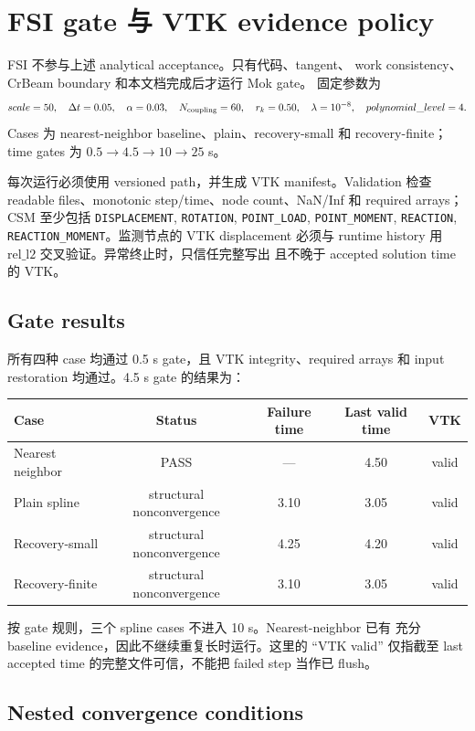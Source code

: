 \documentclass[11pt,a4paper]{article}
\newcommand{\relLtwo}{\mathrm{rel\_l2}}
\begin{document}
\section{FSI gate 与 VTK evidence policy}

FSI 不参与上述 analytical acceptance。只有代码、tangent、
work consistency、CrBeam boundary 和本文档完成后才运行 Mok gate。
固定参数为
\[
 scale=50,\quad\Delta t=0.05,\quad\alpha=0.03,\quad
 N_{\rm coupling}=60,\quad r_k=0.50,\quad
 \lambda=10^{-8},\quad polynomial\_level=4.
\]
Cases 为 nearest-neighbor baseline、plain、recovery-small 和
recovery-finite；time gates 为
$0.5\rightarrow4.5\rightarrow10\rightarrow25$ s。

每次运行必须使用 versioned path，并生成 VTK manifest。Validation
检查 readable files、monotonic step/time、node count、NaN/Inf 和
required arrays；CSM 至少包括
\texttt{DISPLACEMENT}, \texttt{ROTATION}, \texttt{POINT\_LOAD},
\texttt{POINT\_MOMENT}, \texttt{REACTION},
\texttt{REACTION\_MOMENT}。监测节点的 VTK displacement 必须与
runtime history 用 $\relLtwo$ 交叉验证。异常终止时，只信任完整写出
且不晚于 accepted solution time 的 VTK。

\subsection{Gate results}

所有四种 case 均通过 0.5 s gate，且 VTK integrity、required arrays
和 input restoration 均通过。4.5 s gate 的结果为：
\begin{center}
\begin{tabular}{lcccc}
\toprule
Case & Status & Failure time & Last valid time & VTK\\
\midrule
Nearest neighbor & PASS & --- & 4.50 & valid\\
Plain spline & structural nonconvergence & 3.10 & 3.05 & valid\\
Recovery-small & structural nonconvergence & 4.25 & 4.20 & valid\\
Recovery-finite & structural nonconvergence & 3.10 & 3.05 & valid\\
\bottomrule
\end{tabular}
\end{center}
按 gate 规则，三个 spline cases 不进入 10 s。Nearest-neighbor 已有
充分 baseline evidence，因此不继续重复长时运行。这里的 ``VTK
valid'' 仅指截至 last accepted time 的完整文件可信，不能把 failed
step 当作已 flush。

\subsection{Nested convergence conditions}
\end{document}
